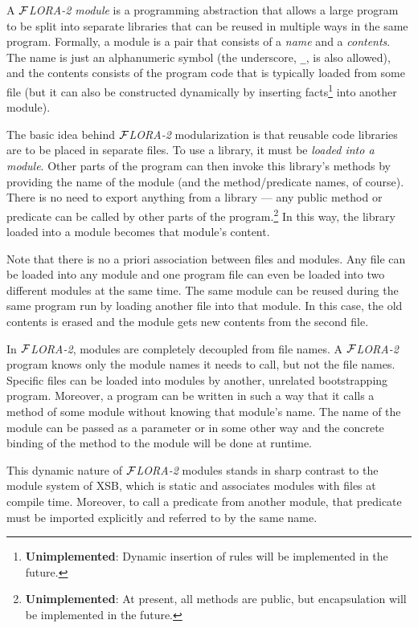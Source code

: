 \documentclass[11pt]{article}
\newcommand{\FLORA}{{\mbox{${\cal F}${\small\it LORA}\rm\emph{-2}}}\xspace}
\begin{document}
A \emph{\FLORA module} is a programming abstraction that allows a large
program to be split into separate libraries that can be reused in multiple
ways in the same program. Formally, a module is a pair that consists of a
\emph{name} and a \emph{contents}. The name is just an alphanumeric symbol
(the underscore, {\tt \_}, is also allowed), and the contents consists of
the program code that is typically loaded from some file (but it can also
be constructed dynamically by inserting facts\footnote{
  {\bf Unimplemented}: Dynamic insertion of rules will be implemented in
  the future.
  }
into another module).

The basic idea behind \FLORA modularization is that reusable code libraries
are to be placed in separate files.  To use a library, it must be
\emph{loaded into a module}. Other parts of the program can then invoke
this library's methods by providing the name of the module (and the
method/predicate names, of course).  There is no need to export anything
from a library --- any public method or predicate can be called by other
parts of the program.\footnote{
  {\bf Unimplemented}: At present, all methods are public, but
  encapsulation will be implemented in the future.
  }
In this way, the library loaded into a module becomes that module's content.

Note that there is no a priori association between files and modules.  Any
file can be loaded into any module and one program file can even be loaded
into two different modules at the same time. The same module can be reused
during the same program run by loading another file into that module. In
this case, the old contents is erased and the module gets new contents from
the second file.

In \FLORA, modules are completely decoupled from file
names. A \FLORA program knows only the module names it needs to call, but
not the file names. Specific files can be loaded into modules by another,
unrelated bootstrapping program. Moreover, a program can be written in such
a way that it calls a method of some module without knowing that module's
name. The name of the module can be passed as a parameter or in some other
way and the concrete binding of the method to the module will be done at
runtime.

This dynamic nature of \FLORA modules stands in sharp contrast to the module
system of XSB, which is static and associates modules with files at compile
time. Moreover, to call a predicate from another module, that predicate
must be imported explicitly and referred to by the same name.
\end{document}
